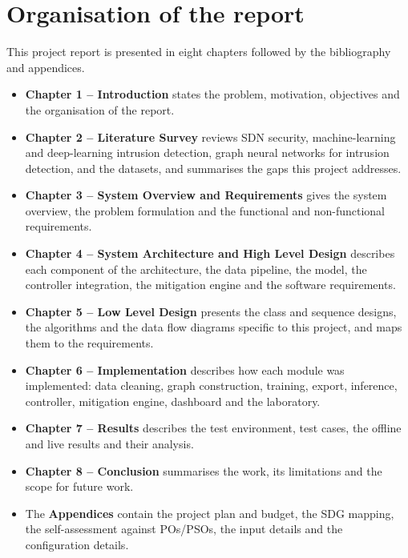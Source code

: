 \section{Organisation of the report}
This project report is presented in eight chapters followed by the bibliography and appendices.
\begin{itemize}
	\item \textbf{Chapter 1 -- Introduction} states the problem, motivation, objectives and the organisation of the report.
	\item \textbf{Chapter 2 -- Literature Survey} reviews SDN security, machine-learning and deep-learning intrusion detection, graph neural networks for intrusion detection, and the datasets, and summarises the gaps this project addresses.
	\item \textbf{Chapter 3 -- System Overview and Requirements} gives the system overview, the problem formulation and the functional and non-functional requirements.
	\item \textbf{Chapter 4 -- System Architecture and High Level Design} describes each component of the architecture, the data pipeline, the model, the controller integration, the mitigation engine and the software requirements.
	\item \textbf{Chapter 5 -- Low Level Design} presents the class and sequence designs, the algorithms and the data flow diagrams specific to this project, and maps them to the requirements.
	\item \textbf{Chapter 6 -- Implementation} describes how each module was implemented: data cleaning, graph construction, training, export, inference, controller, mitigation engine, dashboard and the laboratory.
	\item \textbf{Chapter 7 -- Results} describes the test environment, test cases, the offline and live results and their analysis.
	\item \textbf{Chapter 8 -- Conclusion} summarises the work, its limitations and the scope for future work.
	\item The \textbf{Appendices} contain the project plan and budget, the SDG mapping, the self-assessment against POs/PSOs, the input details and the configuration details.
\end{itemize}
